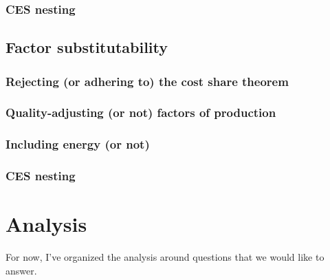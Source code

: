 \documentclass[preprint,authoryear,12pt]{elsarticle}\usepackage[]{graphicx}\usepackage[]{color}
\begin{document}
\subsubsection{CES nesting} 
\label{sec:fs_nesting}



\subsection{Factor substitutability} 
\label{sec:substitutability}


\subsubsection{Rejecting (or adhering to) the cost share theorem} 
\label{sec:sigma_cst}


\subsubsection{Quality-adjusting (or not) factors of production} 
\label{sec:sigma_fop}


\subsubsection{Including energy (or not)} 
\label{sec:sigma_energy}


\subsubsection{CES nesting} 
\label{sec:sigma_nesting}






\section{Analysis}
\label{sec:analysis}

For now, I've organized the analysis around questions that we would like to answer.


\end{document}
